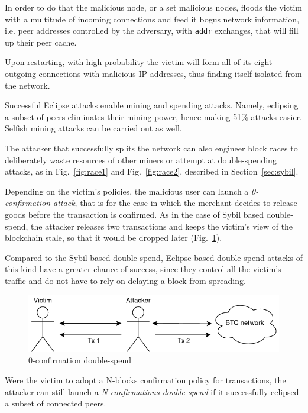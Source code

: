\documentclass[12pt, letterpaper, twoside]{article}
\begin{document}
In order to do that the malicious node, or a set malicious nodes, floods the victim with a multitude of incoming connections and feed it bogus network information, i.e. peer addresses controlled by the adversary, with \texttt{addr} exchanges, that will fill up their peer cache.

Upon restarting, with high probability the victim will form all of its eight outgoing connections with malicious IP addresses, thus finding itself isolated from the network.

Successful Eclipse attacks enable mining and spending attacks. Namely, eclipsing a subset of peers eliminates their mining power, hence making 51\% attacks easier. Selfish mining attacks can be carried out as well.

The attacker that successfully splits the network can also engineer block races to deliberately waste resources of other miners or attempt at double-spending attacks, as in Fig.~\ref{fig:race1} and Fig.~\ref{fig:race2}, described in Section~\ref{sec:sybil}.

Depending on the victim's policies, the malicious user can launch a \textit{0-confirmation attack}, that is for the case in which the merchant decides to release goods before the transaction is confirmed. As in the case of Sybil based double-spend, the attacker releases two transactions and keeps the victim's view of the blockchain stale, so that it would be dropped later (Fig.~\ref{fig:0confirm}).

Compared to the Sybil-based double-spend, Eclipse-based double-spend attacks of this kind have a greater chance of success, since they control all the victim's traffic and do not have to rely on delaying a block from spreading.

\begin{figure}[h!]
	\includegraphics[width=.7\textwidth]{pict/0confirm-doublespend.png}
	\centering
	\caption{0-confirmation double-spend}
	\label{fig:0confirm}
\end{figure}

Were the victim to adopt a N-blocks confirmation policy for transactions, the attacker can still launch a \textit{N-confirmations double-spend} if it successfully eclipsed a subset of connected peers.
\end{document}

